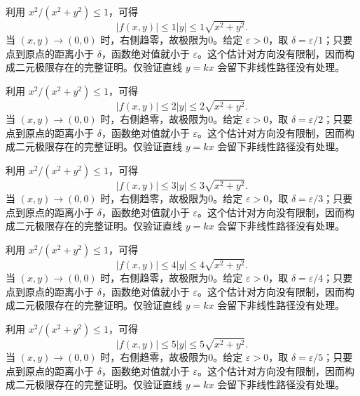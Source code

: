 \documentclass[12pt,fontset=fandol]{ctexart}
\begin{document}
\begin{solve}\label{ans:c32q2}
利用 $x^2/(x^2+y^2)\le1$，可得
\[
|f(x,y)|\le 1|y|\le 1\sqrt{x^2+y^2}.
\]
当 $(x,y)\to(0,0)$ 时，右侧趋零，故极限为0。给定 $\varepsilon>0$，取 $\delta=\varepsilon/1$；只要点到原点的距离小于 $\delta$，函数绝对值就小于 $\varepsilon$。这个估计对方向没有限制，因而构成二元极限存在的完整证明。仅验证直线 $y=kx$ 会留下非线性路径没有处理。
\end{solve}

\begin{solve}\label{ans:c32q3}
利用 $x^2/(x^2+y^2)\le1$，可得
\[
|f(x,y)|\le 2|y|\le 2\sqrt{x^2+y^2}.
\]
当 $(x,y)\to(0,0)$ 时，右侧趋零，故极限为0。给定 $\varepsilon>0$，取 $\delta=\varepsilon/2$；只要点到原点的距离小于 $\delta$，函数绝对值就小于 $\varepsilon$。这个估计对方向没有限制，因而构成二元极限存在的完整证明。仅验证直线 $y=kx$ 会留下非线性路径没有处理。
\end{solve}

\begin{solve}\label{ans:c32q4}
利用 $x^2/(x^2+y^2)\le1$，可得
\[
|f(x,y)|\le 3|y|\le 3\sqrt{x^2+y^2}.
\]
当 $(x,y)\to(0,0)$ 时，右侧趋零，故极限为0。给定 $\varepsilon>0$，取 $\delta=\varepsilon/3$；只要点到原点的距离小于 $\delta$，函数绝对值就小于 $\varepsilon$。这个估计对方向没有限制，因而构成二元极限存在的完整证明。仅验证直线 $y=kx$ 会留下非线性路径没有处理。
\end{solve}

\begin{solve}\label{ans:c32q5}
利用 $x^2/(x^2+y^2)\le1$，可得
\[
|f(x,y)|\le 4|y|\le 4\sqrt{x^2+y^2}.
\]
当 $(x,y)\to(0,0)$ 时，右侧趋零，故极限为0。给定 $\varepsilon>0$，取 $\delta=\varepsilon/4$；只要点到原点的距离小于 $\delta$，函数绝对值就小于 $\varepsilon$。这个估计对方向没有限制，因而构成二元极限存在的完整证明。仅验证直线 $y=kx$ 会留下非线性路径没有处理。
\end{solve}

\begin{solve}\label{ans:c32q6}
利用 $x^2/(x^2+y^2)\le1$，可得
\[
|f(x,y)|\le 5|y|\le 5\sqrt{x^2+y^2}.
\]
当 $(x,y)\to(0,0)$ 时，右侧趋零，故极限为0。给定 $\varepsilon>0$，取 $\delta=\varepsilon/5$；只要点到原点的距离小于 $\delta$，函数绝对值就小于 $\varepsilon$。这个估计对方向没有限制，因而构成二元极限存在的完整证明。仅验证直线 $y=kx$ 会留下非线性路径没有处理。
\end{solve}
\end{document}
